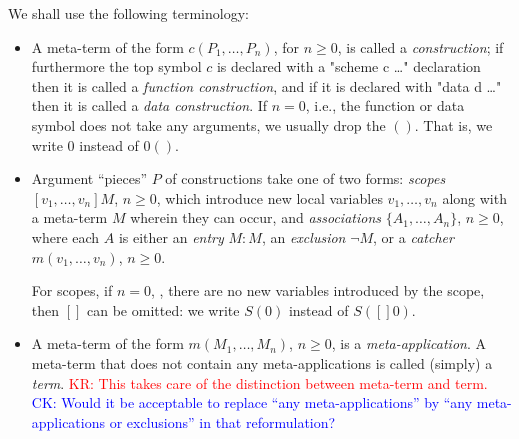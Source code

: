\documentclass[letterpaper,11pt]{article}
\newcommand{\CK}[1]{\textcolor{blue}{CK: #1}}
\newcommand{\KR}[1]{\textcolor{red}{KR: #1}}
\newcommand{\MS}[1]{\textcolor{violet}{MS: #1}}
\begin{document}
We shall use the following terminology:
\begin{itemize}

\item A meta-term of the form $c(P_1,…,P_n)$, for $n≥0$, is called a \emph{construction}; if furthermore
  the top symbol $c$ is declared with a "scheme c {…}" declaration then it is called a
  \emph{function construction}, and if it is declared with "data d {…}" then it is called a
  \emph{data construction}. If $n=0$, i.e., the function or data symbol does not take any arguments,
  we usually drop the $()$. That is, we write $0$ instead of $0()$.


\item Argument ``pieces'' $P$ of constructions take one of two forms: \emph{scopes} $[v_1,…,v_n]M$,
  $n≥0$, which introduce new local variables $v_1,…,v_n$ along with a meta-term $M$ wherein they can
  occur, and \emph{associations} $\{A_1,…,A_n\}$, $n≥0$, where each $A$ is either an \emph{entry}
  $M:M$, an \emph{exclusion} $¬M$, or a \emph{catcher} $m(v_1,…,v_n)$, $n≥0$.

  For scopes, if $n=0$, \ie, there are no new variables introduced by the scope, then $[]$ can be
  omitted: we write $S(0)$ instead of $S([]0)$.

\item A meta-term of the form $m(M_1,…,M_n)$, $n≥0$, is a \emph{meta-application}.  A meta-term that
  does not contain any meta-applications is called (simply) a \emph{term}.
  \KR{This takes care of the distinction between meta-term and term.}
  \CK{Would it be acceptable to replace ``any meta-applications'' by ``any meta-applications or exclusions'' in that reformulation?}


\end{itemize}
\end{document}
